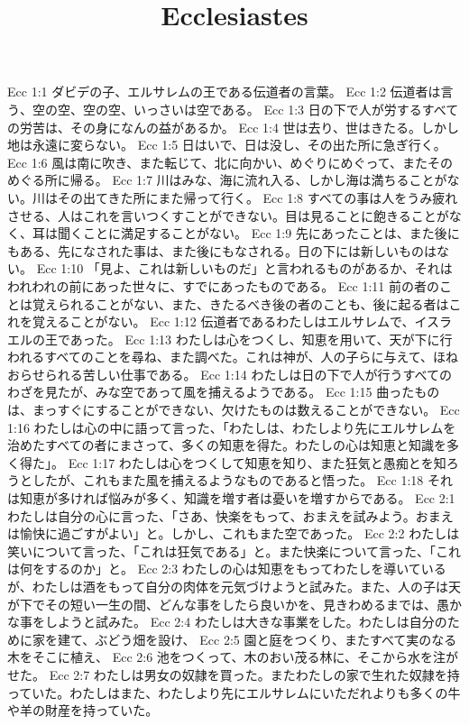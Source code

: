 

\title{Ecclesiastes}

Ecc 1:1  ダビデの子、エルサレムの王である伝道者の言葉。
Ecc 1:2  伝道者は言う、空の空、空の空、いっさいは空である。
Ecc 1:3  日の下で人が労するすべての労苦は、その身になんの益があるか。
Ecc 1:4  世は去り、世はきたる。しかし地は永遠に変らない。
Ecc 1:5  日はいで、日は没し、その出た所に急ぎ行く。
Ecc 1:6  風は南に吹き、また転じて、北に向かい、めぐりにめぐって、またそのめぐる所に帰る。
Ecc 1:7  川はみな、海に流れ入る、しかし海は満ちることがない。川はその出てきた所にまた帰って行く。
Ecc 1:8  すべての事は人をうみ疲れさせる、人はこれを言いつくすことができない。目は見ることに飽きることがなく、耳は聞くことに満足することがない。
Ecc 1:9  先にあったことは、また後にもある、先になされた事は、また後にもなされる。日の下には新しいものはない。
Ecc 1:10  「見よ、これは新しいものだ」と言われるものがあるか、それはわれわれの前にあった世々に、すでにあったものである。
Ecc 1:11  前の者のことは覚えられることがない、また、きたるべき後の者のことも、後に起る者はこれを覚えることがない。
Ecc 1:12  伝道者であるわたしはエルサレムで、イスラエルの王であった。
Ecc 1:13  わたしは心をつくし、知恵を用いて、天が下に行われるすべてのことを尋ね、また調べた。これは神が、人の子らに与えて、ほねおらせられる苦しい仕事である。
Ecc 1:14  わたしは日の下で人が行うすべてのわざを見たが、みな空であって風を捕えるようである。
Ecc 1:15  曲ったものは、まっすぐにすることができない、欠けたものは数えることができない。
Ecc 1:16  わたしは心の中に語って言った、「わたしは、わたしより先にエルサレムを治めたすべての者にまさって、多くの知恵を得た。わたしの心は知恵と知識を多く得た」。
Ecc 1:17  わたしは心をつくして知恵を知り、また狂気と愚痴とを知ろうとしたが、これもまた風を捕えるようなものであると悟った。
Ecc 1:18  それは知恵が多ければ悩みが多く、知識を増す者は憂いを増すからである。
Ecc 2:1  わたしは自分の心に言った、「さあ、快楽をもって、おまえを試みよう。おまえは愉快に過ごすがよい」と。しかし、これもまた空であった。
Ecc 2:2  わたしは笑いについて言った、「これは狂気である」と。また快楽について言った、「これは何をするのか」と。
Ecc 2:3  わたしの心は知恵をもってわたしを導いているが、わたしは酒をもって自分の肉体を元気づけようと試みた。また、人の子は天が下でその短い一生の間、どんな事をしたら良いかを、見きわめるまでは、愚かな事をしようと試みた。
Ecc 2:4  わたしは大きな事業をした。わたしは自分のために家を建て、ぶどう畑を設け、
Ecc 2:5  園と庭をつくり、またすべて実のなる木をそこに植え、
Ecc 2:6  池をつくって、木のおい茂る林に、そこから水を注がせた。
Ecc 2:7  わたしは男女の奴隷を買った。またわたしの家で生れた奴隷を持っていた。わたしはまた、わたしより先にエルサレムにいただれよりも多くの牛や羊の財産を持っていた。
